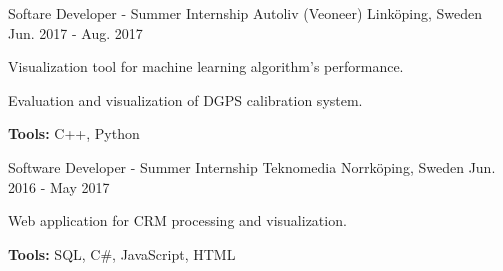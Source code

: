 \begin{cventries}
  \cventry
    {Softare Developer - Summer Internship} %
    {Autoliv (Veoneer)} %
    {Linköping, Sweden} %
    {Jun. 2017 - Aug. 2017} %
    {
      \begin{cvitems} %
        \item {Visualization tool for machine learning algorithm's performance.}
        \item {Evaluation and visualization of DGPS calibration system.}
        \item {\textbf{Tools:} C++, Python}
      \end{cvitems}
    }

  \cventry
    {Software Developer - Summer Internship} %
    {Teknomedia} %
    {Norrköping, Sweden} %
    {Jun. 2016 - May 2017} %
    {
      \begin{cvitems} %
        \item {Web application for CRM processing and visualization.}
        \item {\textbf{Tools:} SQL, C\#, JavaScript, HTML}
      \end{cvitems}
    }

\end{cventries}
